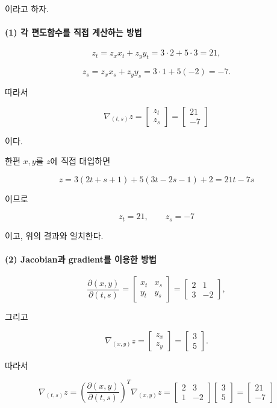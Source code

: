 \documentclass[11pt,a4paper]{article}
\begin{document}
이라고 하자.

\paragraph{(1) 각 편도함수를 직접 계산하는 방법}

\[
z_t=z_xx_t+z_yy_t
=
3\cdot2+5\cdot3
=
21,
\]

\[
z_s=z_xx_s+z_yy_s
=
3\cdot1+5(-2)
=
-7.
\]

따라서

\[
\boxed{
\nabla_{(t,s)}z
=
\begin{bmatrix}
z_t\\
z_s
\end{bmatrix}
=
\begin{bmatrix}
21\\
-7
\end{bmatrix}
}
\]

이다.

한편 $x,y$를 $z$에 직접 대입하면

\[
z
=
3(2t+s+1)
+
5(3t-2s-1)
+
2
=
21t-7s
\]

이므로

\[
z_t=21,
\qquad
z_s=-7
\]

이고, 위의 결과와 일치한다.

\paragraph{(2) Jacobian과 gradient를 이용한 방법}

\[
\frac{\partial(x,y)}{\partial(t,s)}
=
\begin{bmatrix}
x_t & x_s\\
y_t & y_s
\end{bmatrix}
=
\begin{bmatrix}
2 & 1\\
3 & -2
\end{bmatrix},
\]

그리고

\[
\nabla_{(x,y)}z
=
\begin{bmatrix}
z_x\\
z_y
\end{bmatrix}
=
\begin{bmatrix}
3\\
5
\end{bmatrix}.
\]

따라서

\[
\boxed{
\nabla_{(t,s)}z
=
\left(
\frac{\partial(x,y)}{\partial(t,s)}
\right)^T
\nabla_{(x,y)}z
=
\begin{bmatrix}
2 & 3\\
1 & -2
\end{bmatrix}
\begin{bmatrix}
3\\
5
\end{bmatrix}
=
\begin{bmatrix}
21\\
-7
\end{bmatrix}
}
\]
\end{document}
